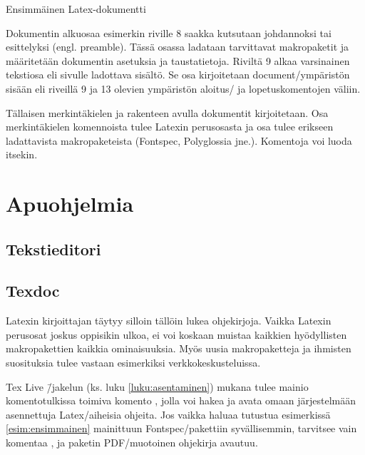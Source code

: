 \begin{esimerkki}
\caption{Ensimmäinen Latex-dokumentti}
\label{esim:ensimmainen}
\end{esimerkki}

Dokumentin alku\-osaa esimerkin riville 8 saakka kutsutaan johdannoksi
tai esittelyksi (engl. \textenglish{preamble}). Tässä osassa ladataan
tarvittavat makropaketit ja määritetään dokumentin asetuksia ja
taustatietoja. Riviltä 9 alkaa varsinainen teksti\-osa eli sivulle
ladottava sisältö. Se osa kirjoitetaan
\textenglish{document}\-/ympäristön sisään eli riveillä 9 ja 13 olevien
ympäristön aloitus\-/{} ja lopetuskomentojen väliin.

Tällaisen merkintäkielen ja rakenteen avulla dokumentit kirjoitetaan.
Osa merkintäkielen komennoista tulee Latexin perus\-osasta ja osa tulee
erikseen ladattavista makropaketeista (Fontspec, Polyglossia jne.).
Komentoja voi luoda itsekin.

\section{Apuohjelmia}

\subsection{Tekstieditori}

\subsection{Texdoc}

Latexin kirjoittajan täytyy silloin tällöin lukea ohjekirjoja. Vaikka
Latexin perus\-osat joskus oppisikin ulkoa, ei voi koskaan muistaa
kaikkien hyödyllisten makropakettien kaikkia ominaisuuksia. Myös uusia
makropaketteja ja ihmisten suosituksia tulee vastaan esimerkiksi
verkkokeskusteluissa.

Tex Live \=/jakelun (ks. luku \ref{luku:asentaminen}) mukana tulee
mainio komentotulkissa toimiva komento , jolla voi hakea
ja avata omaan järjestelmään asennettuja Latex\-/aiheisia ohjeita. Jos
vaikka haluaa tutustua esimerkissä \ref{esim:ensimmainen} mainittuun
Fontspec\-/pakettiin syvällisemmin, tarvitsee vain komentaa
, ja paketin PDF\-/muotoinen ohjekirja avautuu.

